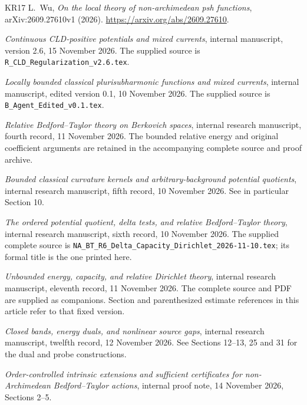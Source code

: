 \documentclass[11pt,reqno]{amsart}
\theoremstyle{definition}
\theoremstyle{remark}
\numberwithin{equation}{section}
\begin{document}
\begin{thebibliography}{KR17}
L.~Wu, \emph{On the local theory of non-archimedean psh functions},
arXiv:2609.27610v1 (2026).
\url{https://arxiv.org/abs/2609.27610}.

\emph{Continuous CLD-positive potentials and mixed currents},
internal manuscript, version 2.6, 15 November 2026.
The supplied source is \nolinkurl{R_CLD_Regularization_v2.6.tex}.

\emph{Locally bounded classical plurisubharmonic functions
and mixed currents}, internal manuscript, edited version 0.1,
10 November 2026.
The supplied source is \nolinkurl{B_Agent_Edited_v0.1.tex}.

\emph{Relative Bedford--Taylor theory on Berkovich spaces},
internal research manuscript, fourth record, 11 November 2026.
The bounded relative energy and original coefficient arguments are
retained in the accompanying complete source and proof archive.

\emph{Bounded classical curvature kernels and arbitrary-background
potential quotients}, internal research manuscript, fifth record,
10 November 2026. See in particular Section 10.

\emph{The ordered potential quotient, delta tests, and relative
Bedford--Taylor theory}, internal research manuscript, sixth record,
10 November 2026. The supplied complete source is
\nolinkurl{NA_BT_R6_Delta_Capacity_Dirichlet_2026-11-10.tex};
its formal title is the one printed here.

\emph{Unbounded energy, capacity, and relative Dirichlet theory},
internal research manuscript, eleventh record, 11 November 2026.
The complete source and PDF are supplied as companions. Section and
parenthesized estimate references in this article refer to that
fixed version.

\emph{Closed bands, energy duals, and nonlinear source gaps},
internal research manuscript, twelfth record, 12 November 2026.
See Sections 12--13, 25 and 31 for the dual and probe constructions.

\emph{Order-controlled intrinsic extensions and sufficient certificates
for non-Archimedean Bedford--Taylor actions}, internal proof note,
14 November 2026, Sections 2--5.
\end{thebibliography}

\end{document}
